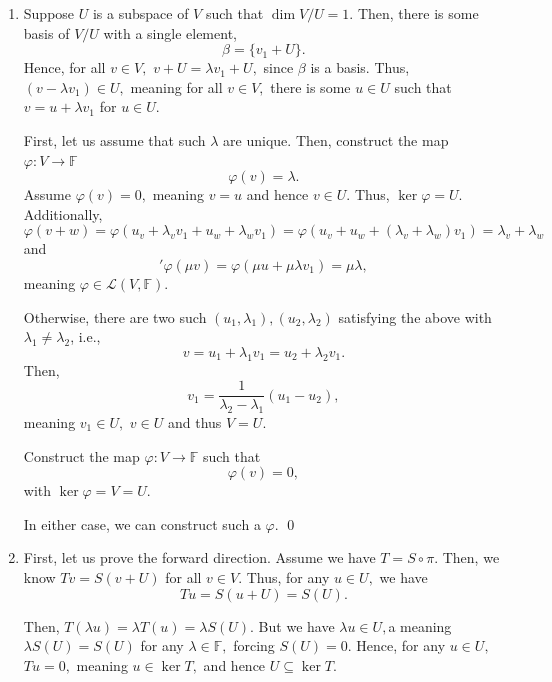 \documentclass[12pt]{article}
\begin{document}
\begin{enumerate}
    Therefore, both $S, T$ are bijective, meaning both $S, T$ have inverses.

    Then,m assume $S$ and $T$ are invertible. Then, $L = T^{-1}S^{-1}$ satisfies
    $$
    ST T^{-1} S^{-1} = SS^{-1} = I,
    $$
    and $$
    T^{-1} S^{-1} ST = T^{-1}T + I,
    $$
    meaning $L$ is an inverse of $ST,$ and hence $ST$ is invertible. \qed

  \item Suppose $U$ is a subspace of $V$ such that $\dim V/ U = 1.$
    Then, there is some basis of $V / U$ with a single element,
    $$\beta = \{v_1 + U\}.$$
    Hence, for all $v \in V,$ $v + U = \lambda v_1 + U,$ since
    $\beta$ is a basis. Thus, $(v - \lambda v_1) \in U,$ meaning for
    all $v \in V,$ there is some $u \in U$ such that $v = u + \lambda
    v_1$ for $u \in U.$

    First, let us assume that such $\lambda$ are unique. Then,
    construct the map $\varphi : V \to \mathbb F$
    $$
    \varphi (v) = \lambda.
    $$
    Assume $\varphi(v) = 0,$ meaning $v = u$ and hence $v \in U.$
    Thus, $\ker \varphi = U.$ Additionally, $$\varphi(v + w) =
    \varphi(u_v + \lambda_v v_1 + u_w + \lambda_w v_1) = \varphi(u_v
    + u_w + (\lambda_v + \lambda_w)v_1) = \lambda_v + \lambda_w$$
    and
    $$
    '\varphi(\mu v) = \varphi(\mu u + \mu\lambda v_1) = \mu \lambda,
    $$
    meaning $\varphi \in \mathcal L(V, \mathbb F).$

    Otherwise, there are two such $(u_1, \lambda_1), (u_2,
    \lambda_2)$ satisfying the above with $\lambda_1 \neq \lambda_2$, i.e.,
    $$
    v = u_1 + \lambda_1 v_1 = u_2 + \lambda_2 v_1.
    $$
    Then, $$v_1 = \dfrac{1}{\lambda_2 - \lambda_1}(u_1 - u_2),$$
    meaning $v_1 \in U,$ $v \in U$ and thus $V = U.$

    Construct the map $\varphi : V \to \mathbb F$ such that
    $$
    \varphi(v) = 0,
    $$
    with $\ker \varphi = V = U.$

    In either case, we can construct such a $\varphi.$ \qed

  \item First, let us prove the forward direction. Assume we have $T
    = S \circ \pi.$ Then, we know $Tv = S (v + U)$ for all $v \in V.$
    Thus, for any $u \in U,$ we have
    $$
    Tu = S(u + U) = S(U).
    $$

    Then, $T(\lambda u) = \lambda T(u) = \lambda S(U).$ But we have
    $\lambda u \in U,$a meaning $\lambda S(U) = S(U)$ for any
    $\lambda \in \mathbb F,$ forcing $S(U)= 0.$ Hence, for any $u \in
    U,$ $Tu = 0,$ meaning $u \in \ker T,$ and hence $U \subseteq \ker T.$


\end{enumerate}
\end{document}
